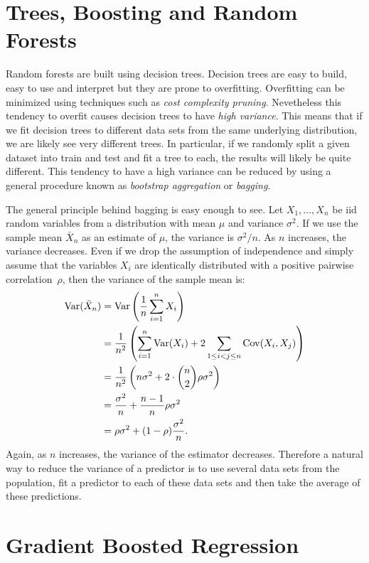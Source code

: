 \chapter{Trees, Boosting and Random Forests}

Random forests are built using decision trees. Decision trees are easy to 
build, easy to use and interpret but they are prone to overfitting. 
Overfitting can be minimized using techniques such as \emph{cost complexity 
pruning}. Nevetheless this tendency to overfit causes decision trees to have 
\emph{high variance}. This means that if we fit decision trees to different 
data sets from the same underlying distribution, we are likely see very different
trees. In particular, if we randomly split a given dataset into train and test
and fit a tree to each, the results will likely be quite different. This tendency 
to have a high variance can be reduced by using a general procedure known 
as \emph{bootstrap aggregation} or \emph{bagging}.

The general principle behind bagging is easy enough to see. Let 
$X_1, \ldots, X_n$ be iid random variables from a distribution with mean $\mu$
and variance $\sigma^2$. If we use the sample mean $\bar{X}_n$ as an estimate 
of $\mu$, the variance is $\sigma^2 / n$. As $n$ increases, the variance 
decreases. Even if we drop the assumption of independence and simply assume 
that the variables $X_i$ are identically distributed with a positive pairwise 
correlation~$\rho$, then the variance of the sample mean is:
\begin{align*}
    \operatorname{Var} (\bar{X}_n) & = \operatorname{Var} \left ( \frac{1}{n} \sum_{i = 1}^{n} X_i \right ) \\
                     & = \frac{1}{n^2} \left ( \sum_{i = 1}^{n} \operatorname{Var} (X_i) + 2 \sum_{1 \leq i < j \leq n} \operatorname{Cov} (X_i, X_j)\right ) \\
                     & = \frac{1}{n^2} \left ( n \sigma^2 + 2 \cdot {n \choose 2} \rho \sigma^2 \right ) \\
                     & = \frac{\sigma^2}{n} + \frac{n - 1}{n} \rho \sigma^2 \\
                     & = \rho \sigma^2 + (1 - \rho) \frac{\sigma^2}{n}.
\end{align*}
Again, as $n$ increases, the variance of the estimator decreases. Therefore a 
natural way to reduce the variance of a predictor is to use several data sets 
from the population, fit a predictor to each of these data sets and then take 
the average of these predictions. 
\chapter{Gradient Boosted Regression}

